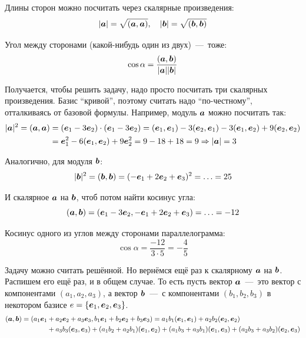 \documentclass[a4paper,12pt]{article}
\begin{document}
  \begin{solution}
    Длины сторон можно посчитать через скалярные произведения:
    \[
      |\boldsymbol a| = \sqrt{(\boldsymbol a, \boldsymbol a)},\quad |\boldsymbol b| = \sqrt{(\boldsymbol b, \boldsymbol b)}
    \]
    
    Угол между сторонами (какой-нибудь один из двух)~---~тоже:
    \[
      \cos \alpha = \frac{(\boldsymbol a, \boldsymbol b)}{|\boldsymbol a| |\boldsymbol b|}
    \]
    
    Получается, чтобы решить задачу, надо просто посчитать три скалярных произведения.
    Базис ``кривой'', поэтому считать надо ``по-честному'', отталкиваясь от базовой формулы.
    Например, модуль $\boldsymbol a$ можно посчитать так:
    \begin{equation*}
    \begin{split}
      |\boldsymbol a|^2 = (\boldsymbol a, \boldsymbol a) &= (\boldsymbol e_1 - 3 \boldsymbol e_2) \cdot (\boldsymbol e_1 - 3 \boldsymbol e_2)
      = (\boldsymbol e_1, \boldsymbol e_1) - 3 (\boldsymbol e_2, \boldsymbol e_1) - 3 (\boldsymbol e_1, \boldsymbol e_2) + 9 (\boldsymbol e_2, \boldsymbol e_2)\\
      &= \boldsymbol e_1^2 - 6 (\boldsymbol e_1, \boldsymbol e_2) + 9 \boldsymbol e_2^2
      = 9 - 18 + 18 = 9
      \Rightarrow |\boldsymbol a| = 3
    \end{split}
    \end{equation*}
    
    Аналогично, для модуля $\boldsymbol b$:
    \[
      |\boldsymbol b|^2 = (\boldsymbol b, \boldsymbol b) = (-\boldsymbol e_1 + 2 \boldsymbol e_2 + \boldsymbol e_3)^2 = \ldots = 25
    \]
    
    И скалярное $\boldsymbol a$ на $\boldsymbol b$, чтоб потом найти косинус угла:
    \[
      (\boldsymbol a, \boldsymbol b) = (\boldsymbol e_1 - 3 \boldsymbol e_2, -\boldsymbol e_1 + 2 \boldsymbol e_2 + \boldsymbol e_3) = \ldots = -12
    \]
    
    Косинус одного из углов между сторонами параллелограмма:
    \[
      \cos \alpha = \frac{-12}{3 \cdot 5} = -\frac{4}{5}
    \]
    
    \medskip
    
    Задачу можно считать решённой.
    Но вернёмся ещё раз к скалярному $\boldsymbol a$ на $\boldsymbol b$.
    Распишем его ещё раз, и в общем случае.
    То есть пусть вектор $\boldsymbol a$~---~это вектор с компонентами $(a_1, a_2, a_3)$, а вектор $\boldsymbol b$~---~с компонентами $(b_1, b_2, b_3)$ в некотором базисе $e \hm= \{\bds e_1, \bds e_2, \bds e_3\}$.
    \begin{equation*}
    \begin{split}
      (\boldsymbol a, \boldsymbol b) = (a_1 \boldsymbol e_1 &+ a_2 \boldsymbol e_2 + a_3 \boldsymbol e_3, b_1 \boldsymbol e_1 + b_2 \boldsymbol e_2 + b_3 \boldsymbol e_3) = a_1 b_1 (\boldsymbol e_1, \boldsymbol e_1) + a_2 b_2 (\boldsymbol e_2, \boldsymbol e_2)\\
      &+ a_3 b_3 (\boldsymbol e_3, \boldsymbol e_3)
       + (a_1 b_2 + a_2 b_1) (\boldsymbol e_1, \boldsymbol e_2) + (a_1 b_3 + a_3 b_1) (\boldsymbol e_1, \boldsymbol e_3) + (a_2 b_3 + a_3 b_2) (\boldsymbol e_2, \boldsymbol e_3)\\
    \end{split}
    \end{equation*}
    

\end{solution}
\end{document}
